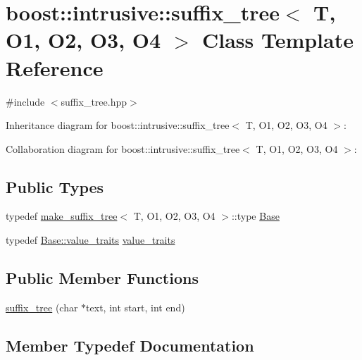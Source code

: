\hypertarget{classboost_1_1intrusive_1_1suffix__tree}{}\section{boost\+:\+:intrusive\+:\+:suffix\+\_\+tree$<$ T, O1, O2, O3, O4 $>$ Class Template Reference}
\label{classboost_1_1intrusive_1_1suffix__tree}


{\ttfamily \#include $<$suffix\+\_\+tree.\+hpp$>$}



Inheritance diagram for boost\+:\+:intrusive\+:\+:suffix\+\_\+tree$<$ T, O1, O2, O3, O4 $>$\+:


Collaboration diagram for boost\+:\+:intrusive\+:\+:suffix\+\_\+tree$<$ T, O1, O2, O3, O4 $>$\+:
\subsection*{Public Types}
\begin{DoxyCompactItemize}
\item 
typedef \hyperlink{structboost_1_1intrusive_1_1make__suffix__tree}{make\+\_\+suffix\+\_\+tree}$<$ T, O1, O2, O3, O4 $>$\+::type \hyperlink{classboost_1_1intrusive_1_1suffix__tree_a4e4d560ba016e68c15ecf4c4f88331e5}{Base}
\item 
typedef \hyperlink{classboost_1_1intrusive_1_1suffix__tree__impl_a30d9e164c38c11cd38917ad14e9f3e88}{Base\+::value\+\_\+traits} \hyperlink{classboost_1_1intrusive_1_1suffix__tree_a20b10e59065c1615575e5f76038289fd}{value\+\_\+traits}
\end{DoxyCompactItemize}
\subsection*{Public Member Functions}
\begin{DoxyCompactItemize}
\item 
\hyperlink{classboost_1_1intrusive_1_1suffix__tree_a3a428cbd18b652d8bfea604a3edb0414}{suffix\+\_\+tree} (char $\ast$text, int start, int end)
\end{DoxyCompactItemize}


\subsection{Member Typedef Documentation}
\mbox{\label{classboost_1_1intrusive_1_1suffix__tree_a4e4d560ba016e68c15ecf4c4f88331e5}} 

